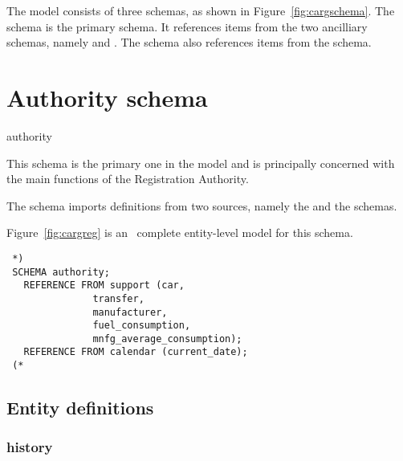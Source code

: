 \documentclass{article}
\providecommand*{\fref}[1]{Figure~\ref{#1}}
\begin{document}
    The model consists of three schemas, as shown in \fref{fig:cargschema}.
The schema  is the primary schema. It references items from
the two ancilliary schemas, namely  and .
The  schema also references items from the 
schema.

\section{Authority schema}

\begin{Mnamedesc}{authority}

\begin{Mdesctext}

This schema is the primary one in the model and is principally concerned
with the main functions of the Registration Authority.

The schema imports definitions from two sources, namely the 
and the  schemas.

     Figure~\ref{fig:cargreg} is an \ExpressG\ complete entity-level model
 for this schema.

 \end{Mdesctext}

 \begin{Mexp}
 \begin{verbatim}
 *)
 SCHEMA authority;
   REFERENCE FROM support (car,
			   transfer,
			   manufacturer,
			   fuel_consumption,
			   mnfg_average_consumption);
   REFERENCE FROM calendar (current_date);
 (*
 \end{verbatim}
 \end{Mexp}
 \end{Mnamedesc}

 \subsection{Entity definitions}

 \subsubsection{history}
\end{document}

